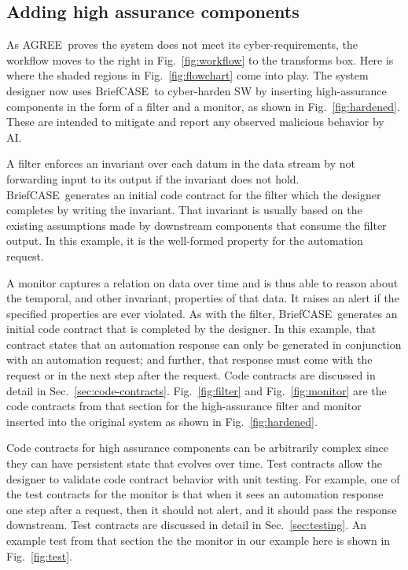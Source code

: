 \documentclass[global,twocolumn]{svjour}
\newcommand{\figref}[1]{Fig.~\ref{#1}}
\newcommand{\secref}[1]{Sec.~\ref{#1}}
\newcommand{\brfcs}{BriefCASE}
\newcommand{\agr}{AGREE}
\begin{document}

\subsection{Adding high assurance components}

As \agr\ proves the system does not meet its cyber-requirements, the workflow moves to the right in \figref{fig:workflow} to the transforms box.
%
Here is where the shaded regions in \figref{fig:flowchart} come into play.
%
The system designer now uses \brfcs\ to cyber-harden SW by inserting high-assurance components in the form of a filter and a monitor, as shown in \figref{fig:hardened}.
%
These are intended to mitigate and report any observed malicious behavior by AI.

A filter enforces an invariant over each datum in the data stream by not forwarding input to its output if the invariant does not hold.
%
\brfcs\ generates an initial code contract for the filter which the designer completes by writing the invariant.
%
That invariant is usually based on the existing assumptions made by downstream components that consume the filter output.
%
In this example, it is the well-formed property for the automation request.

A monitor captures a relation on data over time and is thus able to reason about the temporal, and other invariant, properties of that data.
%
It raises an alert if the specified properties are ever violated.
%
As with the filter, \brfcs\ generates an initial code contract that is completed by the designer.
%
In this example, that contract states that an automation response can only be generated in conjunction with an automation request;
%
and further, that response must come with the request or in the next step after the request.
%
Code contracts are discussed in detail in \secref{sec:code-contracts}.
%
\figref{fig:filter} and \figref{fig:monitor} are the code contracts from that section for the high-assurance filter and monitor inserted into the original system as shown in \figref{fig:hardened}.

Code contracts for high assurance components can be arbitrarily complex since they can have persistent state that evolves over time.
%
Test contracts allow the designer to validate code contract behavior with unit testing.
For example, one of the test contracts for the monitor is that when it sees an automation response one step after a request, then it should not alert, and it should pass the response downstream.
%
Test contracts are discussed in detail in \secref{sec:testing}.
%
An example test from that section the the monitor in our example here is shown in \figref{fig:test}.
\end{document}
